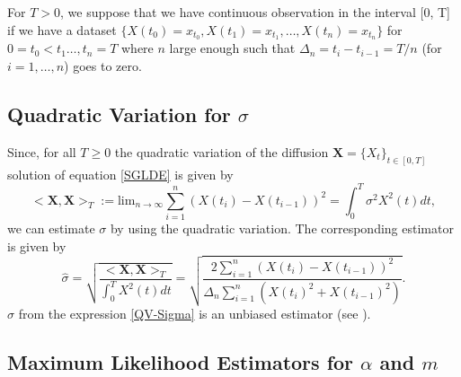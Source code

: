 \documentclass[12pt, reqno]{amsart}
\newcommand{\Pb}{\mathbb P}
\newcommand{\1}{{\bf 1}}
\newcommand{\2}{{\bf 2}}
\theoremstyle{definition}
\theoremstyle{remark}
\numberwithin{equation}{section}
\begin{document}
For $T>0$, we suppose that we have continuous observation in the interval [0, T] if we have a dataset $\{X(t_0)=x_{t_0},X(t_1)=x_{t_1},\ldots,X(t_n)=x_{t_n}\}$ for $0=t_0<t_1\ldots,t_n=T$ where $n$ large enough such that $\Delta_n=t_i-t_{i-1}=T/n$ (for $i=1,\ldots,n$) goes to zero. 

\subsection*{Quadratic Variation for $\sigma$} 
Since, for all $T\geq 0$ the quadratic variation of the diffusion $\bm{X}=\{X_t\}_{t\in[0,T]}$ solution of equation \eqref{SGLDE} is given by
$$<\bm X,\bm X>_T:=\mbox{lim}_{n\rightarrow\infty}\sum_{i=1}^n(X(t_i)-X(t_{i-1}))^2=\int_0^T\sigma^2X^2(t)dt,$$
we can estimate $\sigma$ by using the quadratic variation. The corresponding estimator is given by  
\begin{equation}\label{QV-Sigma}
\hat{\sigma}=\sqrt{\frac{<\bm X,\bm X>_T}{\int_0^TX^2(t)dt}}=\sqrt{\frac{2\sum_{i=1}^n(X(t_i)-X(t_{i-1}))^2}{\Delta_n\sum_{i=1}^n (X(t_i)^2+X(t_{i-1})^2)}}.
\end{equation}
$\hat{\sigma}$ from the expression \eqref{QV-Sigma} is an unbiased estimator (see \cite{wei}). 



\subsection*{Maximum Likelihood Estimators for $\alpha$ and $m$}
\end{document}

